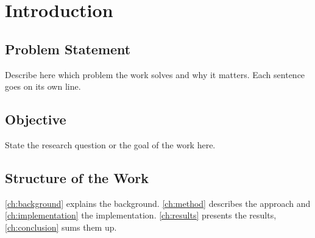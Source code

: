 
\chapter{Introduction}\label{ch:introduction}

\section{Problem Statement}\label{sec:problem}

Describe here which problem the work solves and why it matters.
Each sentence goes on its own line.

\section{Objective}\label{sec:objective}

State the research question or the goal of the work here.

\section{Structure of the Work}\label{sec:structure}

\autoref{ch:background} explains the background.
\autoref{ch:method} describes the approach and \autoref{ch:implementation} the implementation.
\autoref{ch:results} presents the results, \autoref{ch:conclusion} sums them up.
